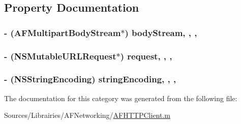 \subsection{Property Documentation}
\hypertarget{category_a_f_streaming_multipart_form_data_07_08_a41a2435c709facb4f2ae4e6ac644088e}{
\subsubsection[{body\-Stream}]{\setlength{\rightskip}{0pt plus 5cm}-\/ ({\bf A\-F\-Multipart\-Body\-Stream}$\ast$) body\-Stream\hspace{0.3cm}{\ttfamily [read]}, {\ttfamily [write]}, {\ttfamily [nonatomic]}, {\ttfamily [strong]}}}\label{category_a_f_streaming_multipart_form_data_07_08_a41a2435c709facb4f2ae4e6ac644088e}
\hypertarget{category_a_f_streaming_multipart_form_data_07_08_a2d0be87dd88432deeb33e4dfea850e48}{
\subsubsection[{request}]{\setlength{\rightskip}{0pt plus 5cm}-\/ (N\-S\-Mutable\-U\-R\-L\-Request$\ast$) request\hspace{0.3cm}{\ttfamily [read]}, {\ttfamily [write]}, {\ttfamily [nonatomic]}, {\ttfamily [copy]}}}\label{category_a_f_streaming_multipart_form_data_07_08_a2d0be87dd88432deeb33e4dfea850e48}
\hypertarget{category_a_f_streaming_multipart_form_data_07_08_aad982e1c61bf6c3416c3e4596dfdf07b}{
\subsubsection[{string\-Encoding}]{\setlength{\rightskip}{0pt plus 5cm}-\/ (N\-S\-String\-Encoding) string\-Encoding\hspace{0.3cm}{\ttfamily [read]}, {\ttfamily [write]}, {\ttfamily [nonatomic]}, {\ttfamily [assign]}}}\label{category_a_f_streaming_multipart_form_data_07_08_aad982e1c61bf6c3416c3e4596dfdf07b}


The documentation for this category was generated from the following file\-:\begin{DoxyCompactItemize}
\item 
Sources/\-Librairies/\-A\-F\-Networking/\hyperlink{_a_f_h_t_t_p_client_8m}{A\-F\-H\-T\-T\-P\-Client.\-m}\end{DoxyCompactItemize}

